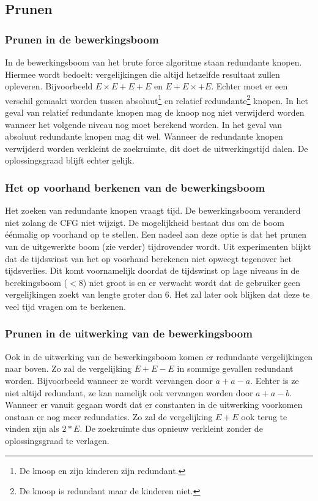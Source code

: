 \documentclass[Main.tex]{subfiles}
\begin{document}
\subsection{Prunen}
\subsubsection*{Prunen in de bewerkingsboom}
In de bewerkingsboom van het brute force algoritme staan redundante knopen. Hiermee wordt bedoelt: vergelijkingen die altijd hetzelfde resultaat zullen opleveren. Bijvoorbeeld $E \times E+E+E$ en $E+E \times +E$. Echter moet er een verschil gemaakt worden tussen absoluut\footnote{\label{note:absoluut}De knoop en zijn kinderen zijn redundant.} en relatief redundante\footnote{\label{note:relatief}De knoop is redundant maar de kinderen niet.} knopen.%
In het geval van relatief redundante knopen mag de knoop nog niet verwijderd worden wanneer het volgende niveau nog moet berekend worden. In het geval van absoluut redundante knopen mag dit wel. Wanneer de redundante knopen verwijderd worden verkleint de zoekruimte, dit doet de uitwerkingstijd dalen. De oplossingsgraad blijft echter gelijk.
\subsubsection*{Het op voorhand berkenen van de bewerkingsboom}
Het zoeken van redundante knopen vraagt tijd. De bewerkingsboom veranderd niet zolang de CFG niet wijzigt. De mogelijkheid bestaat dus om de boom éénmalig op voorhand op te stellen. Een nadeel aan deze optie is dat het prunen van de uitgewerkte boom (zie verder) tijdrovender wordt. Uit experimenten blijkt dat de tijdswinst van het op voorhand berekenen niet opweegt tegenover het tijdsverlies. Dit komt voornamelijk doordat de tijdswinst op lage niveaus in de berekingsboom ($< 8$) niet groot is en er verwacht wordt dat de gebruiker geen vergelijkingen zoekt van lengte groter dan 6. Het zal later ook blijken dat deze te veel tijd vragen om te berkenen. 
\subsubsection*{Prunen in de uitwerking van de bewerkingsboom}
Ook in de uitwerking van de bewerkingsboom komen er redundante vergelijkingen naar boven. Zo zal de vergelijking $E+E-E$ in sommige gevallen redundant worden. Bijvoorbeeld wanneer ze wordt vervangen door $a+a-a$. Echter is ze niet altijd redundant, ze kan namelijk ook vervangen worden door $a+a-b$. Wanneer er vanuit gegaan wordt dat er constanten in de uitwerking voorkomen onstaan er nog meer redundaties. Zo zal de vergelijking $E+E$ ook terug te vinden zijn als $2*E$. De zoekruimte dus opnieuw verkleint zonder de oplossingsgraad te verlagen.
\end{document}
